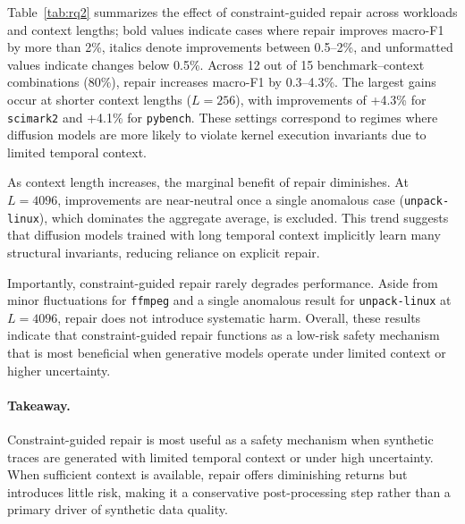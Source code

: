 Table~\ref{tab:rq2} summarizes the effect of constraint-guided repair across workloads and context lengths; bold values indicate cases where repair improves macro-F1 by more than 2\%, italics denote improvements between 0.5--2\%, and unformatted values indicate changes below 0.5\%. Across 12 out of 15 benchmark–context combinations (80\%), repair increases macro-F1 by 0.3--4.3\%. The largest gains occur at shorter context lengths ($L=256$), with improvements of +4.3\% for \texttt{scimark2} and +4.1\% for \texttt{pybench}. These settings correspond to regimes where diffusion models are more likely to violate kernel execution invariants due to limited temporal context.

As context length increases, the marginal benefit of repair diminishes.
At $L=4096$, improvements are near-neutral once a single anomalous case (\texttt{unpack-linux}), which dominates the aggregate average, is excluded.
This trend suggests that diffusion models trained with long temporal context implicitly learn many structural invariants, reducing reliance on explicit repair.

Importantly, constraint-guided repair rarely degrades performance. Aside from minor fluctuations for \texttt{ffmpeg} and a single anomalous result for \texttt{unpack-linux} at $L=4096$, repair does not introduce systematic harm. Overall, these results indicate that constraint-guided repair functions as a low-risk safety mechanism that is most beneficial when generative models operate under limited context or higher uncertainty.

\paragraph{Takeaway.}
Constraint-guided repair is most useful as a safety mechanism when synthetic traces are generated with limited temporal context or under high uncertainty. When sufficient context is available, repair offers diminishing returns but introduces little risk, making it a conservative post-processing step rather than a primary driver of synthetic data quality.


